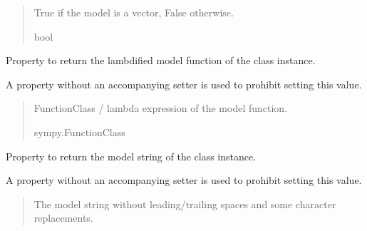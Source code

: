 \documentclass[letterpaper,10pt,english]{sphinxmanual}
\begin{document}
\begin{fulllineitems}
\begin{fulllineitems}
\begin{quote}
\begin{description}
\sphinxAtStartPar
True if the model is a vector, False otherwise.

\sphinxAtStartPar
bool

\end{description}\end{quote}

\end{fulllineitems}


\begin{fulllineitems}
\label{\detokenize{VPCModel:src.VPCModel.VPCModel.model_function}}
\pysigstartsignatures
{}
\pysigstopsignatures
\sphinxAtStartPar
Property to return the lambdified model function of the class instance.

\sphinxAtStartPar
A property without an accompanying setter is used to prohibit setting this value.
\begin{quote}\begin{description}
\sphinxAtStartPar
FunctionClass / lambda expression of the model function.

\sphinxAtStartPar
sympy.FunctionClass

\end{description}\end{quote}

\end{fulllineitems}


\begin{fulllineitems}
\label{\detokenize{VPCModel:src.VPCModel.VPCModel.model_string}}
\pysigstartsignatures
{}
\pysigstopsignatures
\sphinxAtStartPar
Property to return the model string of the class instance.

\sphinxAtStartPar
A property without an accompanying setter is used to prohibit setting this value.
\begin{quote}\begin{description}
\sphinxAtStartPar
The model string without leading/trailing spaces and some character replacements.


\end{description}
\end{quote}
\end{fulllineitems}
\end{fulllineitems}
\end{document}
